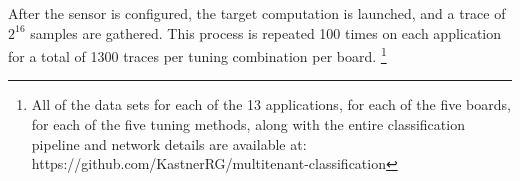 
    
After the sensor is configured, the target computation is launched, and a trace of $2^{16}$ samples are gathered. This process is repeated 100 times on each application for a total of 1300 traces per tuning combination per board. \footnote{All of the data sets for each of the 13 applications, for each of the five boards, for each of the five tuning methods, along with the entire classification pipeline and network details are available at: https://github.com/KastnerRG/multitenant-classification} 


